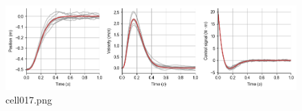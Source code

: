 \begin{figure}[ht]
	\centering
	\includegraphics[scale=0.8, max width=\linewidth]{./fig/motor-learning/infinite-horizon-ofc/cell017.png}
	\caption{cell017.png}
	\label{cell017.png}
\end{figure}